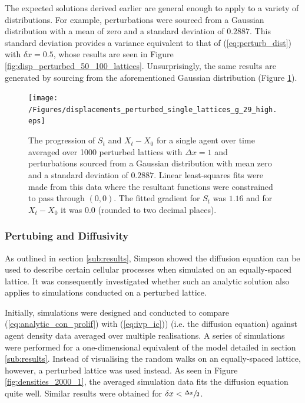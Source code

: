 \documentclass[11pt,titlepage,a4paper]{article}
\begin{document}
			The expected solutions derived earlier are general enough to apply to a variety of distributions. For example, perturbations were sourced from a Gaussian distribution with a mean of zero and a standard deviation of $0.2887$. This standard deviation provides a variance equivalent to that of (\ref{eq:perturb_dist}) with $\delta x = 0.5$, whose results are seen in Figure \ref{fig:disp_perturbed_50_100_lattices}. Unsurprisingly, the same results are generated by sourcing from the aforementioned Gaussian distribution (Figure \ref{fig:displacements_perturbed_single_lattices_g_29_high}).

			\begin{figure}[tbh]
				\centering
					\texttt{[image: /Figures/displacements\_perturbed\_single\_lattices\_g\_29\_high.eps]}
				\caption{The progression of $S_t$ and $X_t - X_0$ for a single agent over time averaged over 1000 perturbed lattices with $\Delta x = 1$ and perturbations sourced from a Gaussian distribution with mean zero and a standard deviation of $0.2887$. Linear least-squares fits were made from this data where the resultant functions were constrained to pass through $(0,0)$. The fitted gradient for $S_t$ was $1.16$ and for $X_t - X_0$ it was $0.0$ (rounded to two decimal places).}
				\label{fig:displacements_perturbed_single_lattices_g_29_high}
			\end{figure}

	
		\subsubsection{Pertubing and Diffusivity}
			\label{subs:pertubinganddiffusivity}
			
			As outlined in section \ref{sub:results}, Simpson showed the diffusion equation can be used to describe certain cellular processes when simulated on an equally-spaced lattice. It was consequently investigated whether such an analytic solution also applies to simulations conducted on a perturbed lattice. 

			Initially, simulations were designed and conducted to compare (\ref{eq:analytic_con_prolif}) with (\ref{eq:ivp_ic})) (i.e. the diffusion equation) against agent density data averaged over multiple realisations. A series of simulations were performed for a one-dimensional equivalent of the model detailed in section \ref{sub:results}. Instead of visualising the random walks on an equally-spaced lattice, however, a perturbed lattice was used instead. As seen in Figure \ref{fig:densities_2000_1}, the averaged simulation data fits the diffusion equation quite well. Similar results were obtained for $\delta x < \sfrac{\Delta x}{2}$.
		
\end{document}
